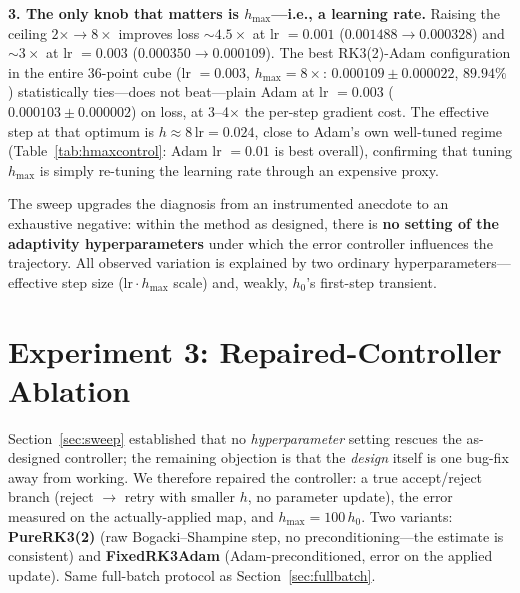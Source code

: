 \documentclass{article}
\newcommand{\hmax}{h_{\max}}
\begin{document}
\textbf{3. The only knob that matters is $\hmax$---i.e., a learning rate.} Raising the ceiling $2{\times}{\to}8{\times}$ improves loss ${\sim}4.5\times$ at lr $=0.001$ ($0.001488 \to 0.000328$) and ${\sim}3\times$ at lr $=0.003$ ($0.000350 \to 0.000109$). The best RK3(2)-Adam configuration in the entire 36-point cube (lr $=0.003$, $\hmax{=}8\times$: $0.000109 \pm 0.000022$, $89.94\%$) statistically ties---does not beat---plain Adam at lr $=0.003$ ($0.000103 \pm 0.000002$) on loss, at 3--4$\times$ the per-step gradient cost. The effective step at that optimum is $h \approx 8\,\mathrm{lr} = 0.024$, close to Adam's own well-tuned regime (Table~\ref{tab:hmaxcontrol}: Adam lr $=0.01$ is best overall), confirming that tuning $\hmax$ is simply re-tuning the learning rate through an expensive proxy.

The sweep upgrades the diagnosis from an instrumented anecdote to an exhaustive negative: within the method as designed, there is \textbf{no setting of the adaptivity hyperparameters} under which the error controller influences the trajectory. All observed variation is explained by two ordinary hyperparameters---effective step size ($\mathrm{lr} \cdot \hmax$ scale) and, weakly, $h_0$'s first-step transient.

\section{Experiment 3: Repaired-Controller Ablation}
\label{sec:repaired}

Section~\ref{sec:sweep} established that no \emph{hyperparameter} setting rescues the as-designed controller; the remaining objection is that the \emph{design} itself is one bug-fix away from working. We therefore repaired the controller: a true accept/reject branch (reject $\to$ retry with smaller $h$, no parameter update), the error measured on the actually-applied map, and $\hmax = 100\,h_0$. Two variants: \textbf{PureRK3(2)} (raw Bogacki--Shampine step, no preconditioning---the estimate is consistent) and \textbf{FixedRK3Adam} (Adam-preconditioned, error on the applied update). Same full-batch protocol as Section~\ref{sec:fullbatch}.
\end{document}
